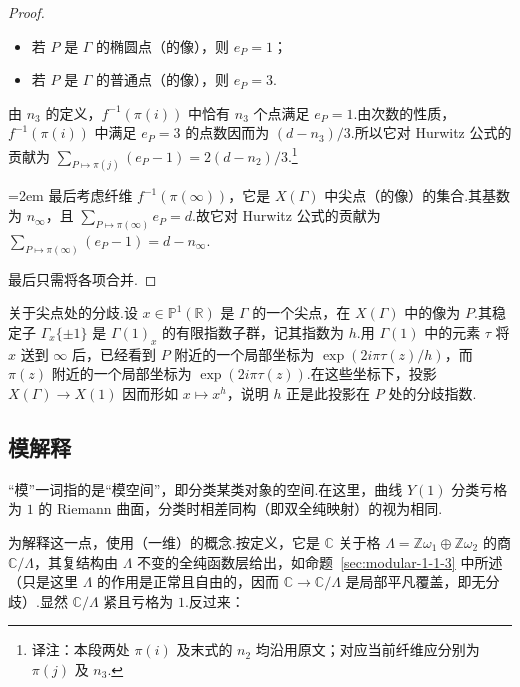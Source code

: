 \begin{proof}
\begin{itemize}
\item 若 $P$ 是 $\Gamma$ 的椭圆点（的像），则 $e_P=1$；

\item 若 $P$ 是 $\Gamma$ 的普通点（的像），则 $e_P=3$.

\end{itemize}

由 $n_3$ 的定义，$f^{-1}(\pi(i))$ 中恰有 $n_3$ 个点满足 $e_P=1$.由次数的性质，$f^{-1}(\pi(i))$ 中满足 $e_P=3$ 的点数因而为 $(d-n_3)/3$.所以它对 Hurwitz 公式的贡献为 $\sum_{P\mapsto\pi(j)}(e_P-1)=2(d-n_2)/3$.\footnote{译注：本段两处 $\pi(i)$ 及末式的 $n_2$ 均沿用原文；对应当前纤维应分别为 $\pi(j)$ 及 $n_3$.}



\begingroup\emergencystretch=2em
最后考虑纤维 $f^{-1}(\pi(\infty))$，它是 $X(\Gamma)$ 中尖点（的像）的集合.其基数为 $n_\infty$，且 $\sum_{P\mapsto\pi(\infty)}e_P=d$.故它对 Hurwitz 公式的贡献为 $\sum_{P\mapsto\pi(\infty)}(e_P-1)=d-n_\infty$.
\par\endgroup



最后只需将各项合并.

\end{proof}

\begin{remark*}

关于尖点处的分歧.设 $x\in\mathbb P^1(\mathbb R)$ 是 $\Gamma$ 的一个尖点，在 $X(\Gamma)$ 中的像为 $P$.其稳定子 $\Gamma_x\{\pm1\}$ 是 $\Gamma(1)_x$ 的有限指数子群，记其指数为 $h$.用 $\Gamma(1)$ 中的元素 $\tau$ 将 $x$ 送到 $\infty$ 后，已经看到 $P$ 附近的一个局部坐标为 $\exp(2i\pi\tau(z)/h)$，而 $\pi(z)$ 附近的一个局部坐标为 $\exp(2i\pi\tau(z))$.在这些坐标下，投影 $X(\Gamma)\longrightarrow X(1)$ 因而形如 $x\mapsto x^h$，说明 $h$ 正是此投影在 $P$ 处的分歧指数.

\end{remark*}



\subsection{模解释}\label{sec:modular-1-1-8}

``模''一词指的是``模空间''，即分类某类对象的空间.在这里，曲线 $Y(1)$ 分类亏格为 $1$ 的 Riemann 曲面，分类时相差同构（即双全纯映射）的视为相同.



为解释这一点，使用（一维）的概念.按定义，它是 $\mathbb C$ 关于格 $\Lambda=\mathbb Z\omega_1\oplus\mathbb Z\omega_2$ 的商 $\mathbb C/\Lambda$，其复结构由 $\Lambda$ 不变的全纯函数层给出，如命题~\ref{sec:modular-1-1-3} 中所述（只是这里 $\Lambda$ 的作用是正常且自由的，因而 $\mathbb C\longrightarrow\mathbb C/\Lambda$ 是局部平凡覆盖，即无分歧）.显然 $\mathbb C/\Lambda$ 紧且亏格为 $1$.反过来：

